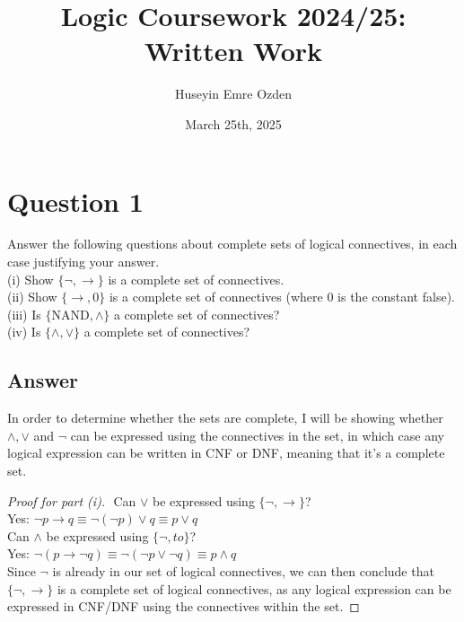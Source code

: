 \documentclass[12pt]{fphw}
\title{Logic Coursework 2024/25: Written Work}
\author{Huseyin Emre Ozden}
\date{March 25th, 2025}
\institute{Durham University}
\begin{document}
\maketitle

\section*{Question 1}

\begin{problem}
  Answer the following questions about complete sets of logical connectives, in each case justifying your answer. \\
  (i) Show $\{\neg, \to \}$ is a complete set of connectives. \\
  (ii) Show $\{\to, 0\}$ is a complete set of connectives (where $0$ is the constant false). \\
  (iii) Is $\{ \text{NAND}, \wedge\}$ a complete set of connectives? \\
  (iv) Is $\{\wedge, \vee\}$ a complete set of connectives?
\end{problem}

\subsection*{Answer}

In order to determine whether the sets are complete, I will be showing whether $\wedge, \vee$ and $\neg$ can be expressed using the connectives in the set, in which case any logical expression can be written in CNF or DNF, meaning that it's a complete set.

\begin{proof}[Proof for part (i)] $ $ \newline
  Can $\vee$ be expressed using $\{\neg, \to \}$? \\ 
  Yes: $\neg p \to q \equiv \neg(\neg p) \vee q \equiv p \vee q$ \\ 
  Can $\wedge$ be expressed using $\{\neg, to \}$? \\ 
  Yes: $\neg(p \to \neg q) \equiv \neg (\neg p \vee \neg q) \equiv p \wedge q$ \\
  Since $\neg$ is already in our set of logical connectives, we can then conclude that $\{\neg, \to \}$ is a complete set of logical connectives, as any logical expression can be expressed in CNF/DNF using the connectives within the set.
\end{proof}
\end{document}
